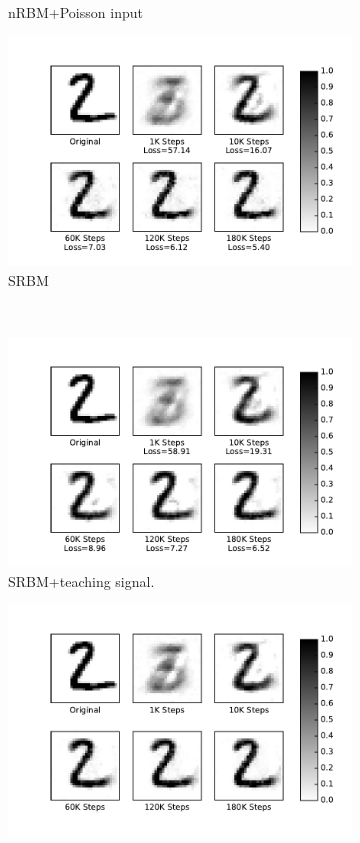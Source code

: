 \begin{figure}
\begin{subfigure}[t]{0.32\textwidth}
		\caption{nRBM+Poisson input}
	\end{subfigure}
	\begin{subfigure}[t]{0.32\textwidth}
		\includegraphics[width=\textwidth]{pics_sdlm/50_MNIST_SRBM_original/recon_digit.pdf}
		\caption{SRBM}
	\end{subfigure}\\
	\begin{subfigure}[t]{0.32\textwidth}
		\includegraphics[width=\textwidth]{pics_sdlm/51_MNIST_SRBM_teach/recon_digit.pdf}
		\caption{SRBM+teaching signal.}
	\end{subfigure}
	\begin{subfigure}[t]{0.32\textwidth}
		\includegraphics[width=\textwidth]{pics_sdlm/noise_rbm/recon_digit.pdf}

\end{subfigure}
\end{figure}
